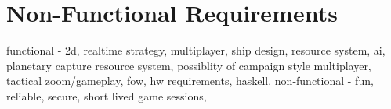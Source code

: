 \section{Non-Functional Requirements}




functional - 2d, realtime strategy, multiplayer, ship design, resource system, ai, planetary capture resource system, possiblity of campaign style multiplayer, tactical zoom/gameplay, fow, hw requirements, haskell.
non-functional - fun, reliable, secure, short lived game sessions, 
